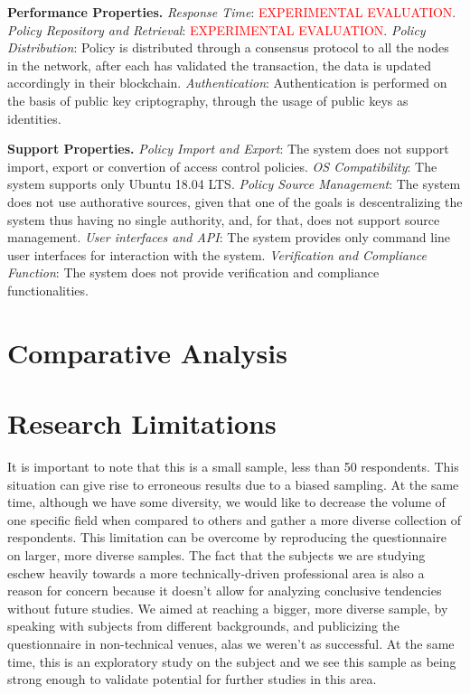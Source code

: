 \textbf{Performance Properties.} \emph{Response Time}: \textcolor{red}{EXPERIMENTAL EVALUATION}. \emph{Policy Repository and Retrieval}: \textcolor{red}{EXPERIMENTAL EVALUATION}. \emph{Policy Distribution}: Policy is distributed through a consensus protocol to all the nodes in the network, after each has validated the transaction, the data is updated accordingly in their blockchain. \emph{Authentication}: Authentication is performed on the basis of public key criptography, through the usage of public keys as identities.

\textbf{Support Properties.} \emph{Policy Import and Export}: The system does not support import, export or convertion of access control policies. \emph{OS Compatibility}: The system supports only Ubuntu 18.04 LTS. \emph{Policy Source Management}: The system does not use authorative sources, given that one of the goals is descentralizing the system thus having no single authority, and, for that, does not support source management. \emph{User interfaces and API}: The system provides only command line user interfaces for interaction with the system. \emph{Verification and Compliance Function}: The system does not provide verification and compliance functionalities.

\section{Comparative Analysis}

\section{Research Limitations}

It is important to note that this is a small sample, less than 50 respondents. This situation can give rise to erroneous results due to a biased sampling. At the same time, although we have some diversity, we would like to decrease the volume of one specific field when compared to others and gather a more diverse collection of respondents. This limitation can be overcome by reproducing the questionnaire on larger, more diverse samples. The fact that the subjects we are studying eschew heavily towards a more technically-driven professional area is also a reason for concern because it doesn't allow for analyzing conclusive tendencies without future studies. We aimed at reaching a bigger, more diverse sample, by speaking with subjects from different backgrounds, and publicizing the questionnaire in non-technical venues, alas we weren't as successful. At the same time, this is an exploratory study on the subject and we see this sample as being strong enough to validate potential for further studies in this area.

